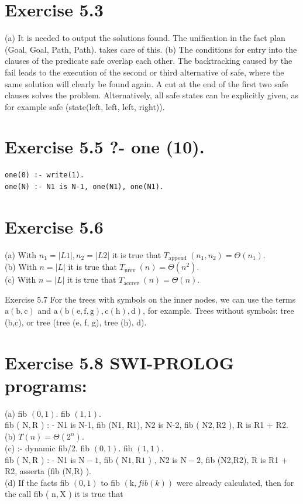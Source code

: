 \documentclass[10pt]{book}
\begin{document}
\section{Exercise 5.3}
(a) It is needed to output the solutions found. The unification in the fact plan (Goal, Goal, Path, Path). takes care of this.
(b) The conditions for entry into the clauses of the predicate safe overlap each other. The backtracking caused by the fail leads to the execution of the second or third alternative of safe, where the same solution will clearly be found again. A cut at the end of the first two safe clauses solves the problem. Alternatively, all safe states can be explicitly given, as for example safe (state(left, left, left, right)).

\section{Exercise 5.5 ?- one (10).}
\begin{verbatim}
one(0) :- write(1).
one(N) :- N1 is N-1, one(N1), one(N1).
\end{verbatim}

\section{Exercise 5.6}
(a) With $n_{1}=|L 1|, n_{2}=|L 2|$ it is true that $T_{\text {append }}\left(n_{1}, n_{2}\right)=\Theta\left(n_{1}\right)$.\\
(b) With $n=|L|$ it is true that $T_{\text {nrev }}(n)=\Theta\left(n^{2}\right)$.\\
(c) With $n=|L|$ it is true that $T_{\text {accrev }}(n)=\Theta(n)$.

Exercise 5.7 For the trees with symbols on the inner nodes, we can use the terms $\mathrm{a}(\mathrm{b}, \mathrm{c})$ and $\mathrm{a}(\mathrm{b}(\mathrm{e}, \mathrm{f}, \mathrm{g}), \mathrm{c}(\mathrm{h}), \mathrm{d})$, for example. Trees without symbols: tree (b,c), or tree (tree (e, f, g), tree (h), d).

\section{Exercise 5.8 SWI-PROLOG programs:}
(a) fib $(0,1)$. fib $(1,1)$.\\
fib ( $\mathrm{N}, \mathrm{R}$ ) : - N1 is N-1, fib (N1, R1), N2 is N-2, fib ( $\mathrm{N} 2, \mathrm{R} 2$ ), R is R1 + R2.\\
(b) $T(n)=\Theta\left(2^{n}\right)$.\\
(c) :- dynamic fib/2. fib $(0,1)$. fib $(1,1)$.\\
fib ( $\mathrm{N}, \mathrm{R}$ ) : - N1 is $\mathrm{N}-1$, fib ( $\mathrm{N} 1, \mathrm{R} 1$ ) , N2 is $\mathrm{N}-2$, fib (N2,R2), R is R1 + R2, asserta (fib (N,R) ).\\
(d) If the facts fib $(0,1)$ to fib $(\mathrm{k}, f i b(k))$ were already calculated, then for the call fib ( $\mathrm{n}, \mathrm{X}$ ) it is true that
\end{document}
